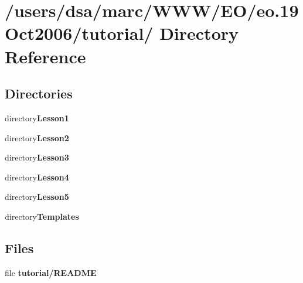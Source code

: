 \section{/users/dsa/marc/WWW/EO/eo.19Oct2006/tutorial/ Directory Reference}
\label{dir_000003}
\subsection*{Directories}
\begin{CompactItemize}
\item 
directory{\bf Lesson1}
\item 
directory{\bf Lesson2}
\item 
directory{\bf Lesson3}
\item 
directory{\bf Lesson4}
\item 
directory{\bf Lesson5}
\item 
directory{\bf Templates}
\end{CompactItemize}
\subsection*{Files}
\begin{CompactItemize}
\item 
file {\bf tutorial/README}
\end{CompactItemize}
